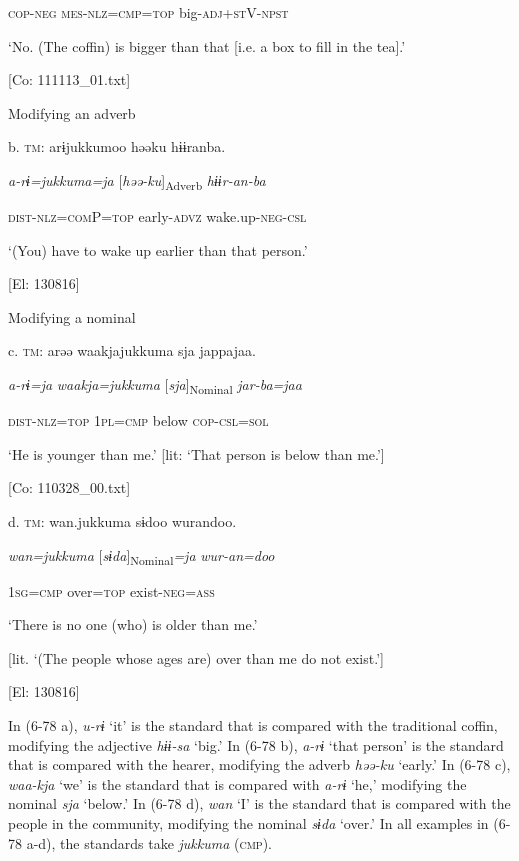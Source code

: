       \textsc{cop}-\textsc{neg}  \textsc{mes}-\textsc{nlz}=\textsc{cmp}=\textsc{top}  big-\textsc{adj}+\textsc{st}V-\textsc{npst}

      ‘No. (The coffin) is bigger than that [i.e. a box to fill in the tea].’

      [Co: 111113\_01.txt]

  Modifying an adverb

  b.  \textsc{tm}:  arɨjukkumoo  həəku  hɨɨranba.

      \textit{a-rɨ=jukkuma=ja}  [\textit{həə-ku}]\textsubscript{Adverb}  \textit{hɨɨr-an-ba}

      \textsc{dist}-\textsc{nlz}=\textsc{com}P=\textsc{top}  early-\textsc{advz}  wake.up-\textsc{neg}-\textsc{csl}

      ‘(You) have to wake up earlier than that person.’

      [El: 130816]

  Modifying a nominal

  c.  \textsc{tm}:  arəə  waakjajukkuma  sja  jappajaa.

      \textit{a-rɨ=ja}  \textit{waakja=jukkuma}  [\textit{sja}]\textsubscript{Nominal}  \textit{jar-ba=jaa}

      \textsc{dist}-\textsc{nlz}=\textsc{top}  1\textsc{pl}=\textsc{cmp}  below  \textsc{cop}-\textsc{csl}=\textsc{sol}

      ‘He is younger than me.’ [lit: ‘That person is below than me.’]

      [Co: 110328\_00.txt]

  d.  \textsc{tm}:  wan.jukkuma  sɨdoo  wurandoo.

      \textit{wan=jukkuma}  [\textit{sɨda}]\textsubscript{Nominal}\textit{=ja}  \textit{wur-an=doo}

      1\textsc{sg}=\textsc{cmp}  over=\textsc{top}  exist-\textsc{neg}=\textsc{ass}

      ‘There is no one (who) is older than me.’

[lit. ‘(The people whose ages are) over than me do not exist.’]

      [El: 130816]

In (6-78 a), \textit{u-rɨ} ‘it’ is the standard that is compared with the traditional coffin, modifying the adjective \textit{hɨɨ-sa} ‘big.’ In (6-78 b), \textit{a-rɨ} ‘that person’ is the standard that is compared with the hearer, modifying the adverb \textit{həə-ku} ‘early.’ In (6-78 c), \textit{waa-kja} ‘we’ is the standard that is compared with \textit{a-rɨ} ‘he,’ modifying the nominal \textit{sja} ‘below.’ In (6-78 d), \textit{wan} ‘I’ is the standard that is compared with the people in the community, modifying the nominal \textit{sɨda} ‘over.’ In all examples in (6-78 a-d), the standards take \textit{jukkuma} (\textsc{cmp}).

